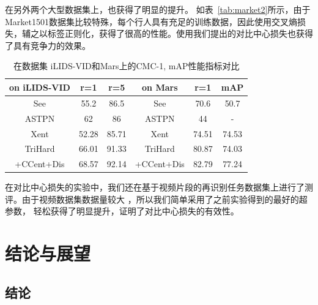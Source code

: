 在另外两个大型数据集上，也获得了明显的提升。
如表~\ref{tab:market2}所示，由于Market1501数据集比较特殊，每个行人具有充足的训练数据，因此使用交叉熵损失，辅之以标签正则化，获得了很高的性能。使用我们提出的对比中心损失也获得了具有竞争力的效果。

\begin{table}
	\centering
	\caption{在数据集 iLIDS-VID和Mars上的CMC-1, mAP性能指标对比}
	\label{tab:mars2}
	\begin{tabular}{c|cc||c|cc}
		\hline
		on  iLIDS-VID              & r=1   & r=5   & on Mars    & r=1   & mAP   \\ \hline  
		See  \cite{zhou2017see}    & 55.2  & 86.5  & See        & 70.6  & 50.7  \\  
		ASTPN \cite{xu2017jointly} & 62    & 86    & ASTPN      & 44    & -     \\ 
		Xent                       & 52.28 & 85.71 & Xent       & 74.51 & 74.53 \\
		TriHard                    & 66.01 & 91.33 & TriHard    & 80.87 & 74.03 \\
		+CCent+Dis                 & 68.57 & 92.14 & +CCent+Dis & 82.79 & 77.24 \\  \hline 
	\end{tabular}
\end{table}

在对比中心损失的实验中，我们还在基于视频片段的再识别任务数据集上进行了测评。由于视频数据集数据量较大
，所以我们简单采用了之前实验得到的最好的超参数，
轻松获得了明显提升，证明了对比中心损失的有效性。

\chapter{结论与展望}

\section{结论}

